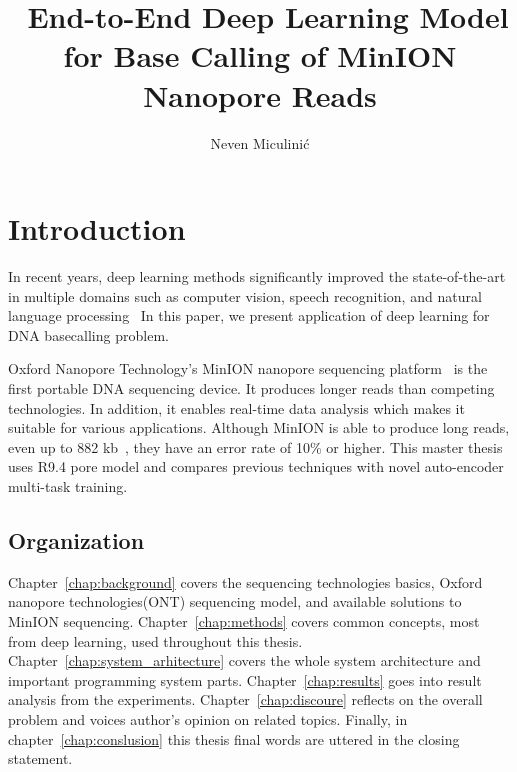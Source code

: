 \documentclass[times, utf8, diplomski, english]{fer}
\begin{document}
\title{ End-to-End Deep Learning Model for Base Calling of MinION Nanopore Reads}
\author{Neven Miculinić}
\maketitle
 



\tableofcontents
\listoffigures

\chapter{Introduction}
\label{chap:Introduction}
In recent years, deep learning methods significantly improved the state-of-the-art in multiple domains such as computer vision, speech recognition, and natural language processing~\citep{LeCun:1998:CNI:303568.303704, NIPS2012_4824}
In this paper, we present application of deep learning for DNA basecalling problem.

Oxford Nanopore Technology's MinION nanopore sequencing platform~\cite{mikheyev2014first} is the first portable DNA sequencing device. It produces longer reads than competing technologies. In addition, it enables real-time data analysis which makes it suitable for various applications.
Although MinION is able to produce long reads, even up to 882 kb~\cite{loman1-100k,loman2-800k}, they have an error rate of 10\% or higher. This master thesis uses R9.4 pore model and compares previous techniques with novel auto-encoder multi-task training. 

\section{Organization}
Chapter~\ref{chap:background} covers the sequencing technologies basics, Oxford nanopore technologies(ONT) sequencing model, and available solutions to MinION sequencing. 
Chapter~\ref{chap:methods} covers common concepts, most from deep learning, used throughout this thesis. 
Chapter~\ref{chap:system_arhitecture} covers the whole system architecture and important programming system parts. 
Chapter~\ref{chap:results} goes into result analysis from the experiments.
Chapter~\ref{chap:discoure} reflects on the overall problem and voices author's opinion on related topics.
Finally, in chapter~\ref{chap:conslusion} this thesis final words are uttered in the closing statement. 
\end{document}
